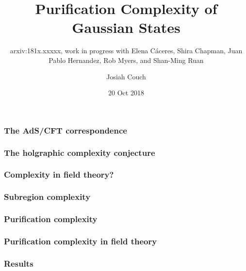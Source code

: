 \documentclass[10pt]{beamer}
\title{Purification Complexity of Gaussian States}
\subtitle{arxiv:181x.xxxxx, work in progress with Elena C\'aceres, Shira Chapman, Juan Pablo Hernandez, Rob Myers, and Shan-Ming Ruan}
\author{Josiah Couch}
\institute{University of Texas at Austin}
\date{20 Oct 2018}
\begin{document}
\begin{frame}
\titlepage\end{frame}

\begin{frame}
\frametitle{The AdS/CFT correspondence}

\end{frame}

\begin{frame}
\frametitle{The holgraphic complexity conjecture}

\end{frame}

\begin{frame}
\frametitle{Complexity in field theory?}

\end{frame}

\begin{frame}
\frametitle{Subregion complexity}

\end{frame}

\begin{frame}
\frametitle{Purification complexity}

\end{frame}

\begin{frame}
\frametitle{Purification complexity in field theory}

\end{frame}

\begin{frame}
\frametitle{Results}

\end{frame}
\end{document}
